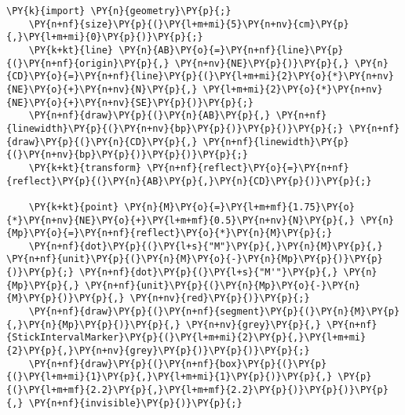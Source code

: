 \begin{Verbatim}[commandchars=\\\{\}]
    \PY{k}{import} \PY{n}{geometry}\PY{p}{;}
    \PY{n+nf}{size}\PY{p}{(}\PY{l+m+mi}{5}\PY{n+nv}{cm}\PY{p}{,}\PY{l+m+mi}{0}\PY{p}{)}\PY{p}{;}
    \PY{k+kt}{line} \PY{n}{AB}\PY{o}{=}\PY{n+nf}{line}\PY{p}{(}\PY{n+nf}{origin}\PY{p}{,} \PY{n+nv}{NE}\PY{p}{)}\PY{p}{,} \PY{n}{CD}\PY{o}{=}\PY{n+nf}{line}\PY{p}{(}\PY{l+m+mi}{2}\PY{o}{*}\PY{n+nv}{NE}\PY{o}{+}\PY{n+nv}{N}\PY{p}{,} \PY{l+m+mi}{2}\PY{o}{*}\PY{n+nv}{NE}\PY{o}{+}\PY{n+nv}{SE}\PY{p}{)}\PY{p}{;}
    \PY{n+nf}{draw}\PY{p}{(}\PY{n}{AB}\PY{p}{,} \PY{n+nf}{linewidth}\PY{p}{(}\PY{n+nv}{bp}\PY{p}{)}\PY{p}{)}\PY{p}{;} \PY{n+nf}{draw}\PY{p}{(}\PY{n}{CD}\PY{p}{,} \PY{n+nf}{linewidth}\PY{p}{(}\PY{n+nv}{bp}\PY{p}{)}\PY{p}{)}\PY{p}{;}
    \PY{k+kt}{transform} \PY{n+nf}{reflect}\PY{o}{=}\PY{n+nf}{reflect}\PY{p}{(}\PY{n}{AB}\PY{p}{,}\PY{n}{CD}\PY{p}{)}\PY{p}{;}

    \PY{k+kt}{point} \PY{n}{M}\PY{o}{=}\PY{l+m+mf}{1.75}\PY{o}{*}\PY{n+nv}{NE}\PY{o}{+}\PY{l+m+mf}{0.5}\PY{n+nv}{N}\PY{p}{,} \PY{n}{Mp}\PY{o}{=}\PY{n+nf}{reflect}\PY{o}{*}\PY{n}{M}\PY{p}{;}
    \PY{n+nf}{dot}\PY{p}{(}\PY{l+s}{"M"}\PY{p}{,}\PY{n}{M}\PY{p}{,} \PY{n+nf}{unit}\PY{p}{(}\PY{n}{M}\PY{o}{-}\PY{n}{Mp}\PY{p}{)}\PY{p}{)}\PY{p}{;} \PY{n+nf}{dot}\PY{p}{(}\PY{l+s}{"M'"}\PY{p}{,} \PY{n}{Mp}\PY{p}{,} \PY{n+nf}{unit}\PY{p}{(}\PY{n}{Mp}\PY{o}{-}\PY{n}{M}\PY{p}{)}\PY{p}{,} \PY{n+nv}{red}\PY{p}{)}\PY{p}{;}
    \PY{n+nf}{draw}\PY{p}{(}\PY{n+nf}{segment}\PY{p}{(}\PY{n}{M}\PY{p}{,}\PY{n}{Mp}\PY{p}{)}\PY{p}{,} \PY{n+nv}{grey}\PY{p}{,} \PY{n+nf}{StickIntervalMarker}\PY{p}{(}\PY{l+m+mi}{2}\PY{p}{,}\PY{l+m+mi}{2}\PY{p}{,}\PY{n+nv}{grey}\PY{p}{)}\PY{p}{)}\PY{p}{;}
    \PY{n+nf}{draw}\PY{p}{(}\PY{n+nf}{box}\PY{p}{(}\PY{p}{(}\PY{l+m+mi}{1}\PY{p}{,}\PY{l+m+mi}{1}\PY{p}{)}\PY{p}{,} \PY{p}{(}\PY{l+m+mf}{2.2}\PY{p}{,}\PY{l+m+mf}{2.2}\PY{p}{)}\PY{p}{)}\PY{p}{,} \PY{n+nf}{invisible}\PY{p}{)}\PY{p}{;}
\end{Verbatim}
